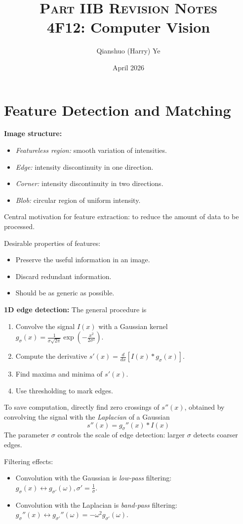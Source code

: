 \documentclass[12pt]{article}
\title{{\scshape  Part IIB Revision Notes} \\ 
    \vspace{0.5em}
    \textbf{4F12: Computer Vision}}
\author{Qianshuo (Harry) Ye}
\date{April 2026}
\begin{document}
\maketitle

\section{Feature Detection and Matching}
\textbf{Image structure:}
\begin{itemize}
    \item \textit{Featureless region:} smooth variation of intensities.
    \item \textit{Edge:} intensity discontinuity in one direction.
    \item \textit{Corner:} intensity discontinuity in two directions.
    \item \textit{Blob:} circular region of uniform intensity.
\end{itemize}

Central motivation for feature extraction: to reduce the amount of data to be processed.

Desirable properties of features:
\begin{itemize}
    \item Preserve the useful information in an image.
    \item Discard redundant information.
    \item Should be as generic as possible.
\end{itemize}

\textbf{1D edge detection:} The general procedure is
\begin{enumerate}
    \item Convolve the signal $I(x)$ with a Gaussian kernel $g_\sigma(x) = \frac{1}{\sigma\sqrt{2\pi}} \exp\left(-\frac{x^2}{2\sigma^2}\right)$.
    \item Compute the derivative $s'(x) = \frac{d}{dx} [I(x) * g_\sigma(x)]$.
    \item Find maxima and minima of $s'(x)$.
    \item Use thresholding to mark edges.
\end{enumerate}
To save computation, directly find zero crossings of $s''(x)$, obtained by convolving the signal with the \textit{Laplacian} of a Gaussian
$$
s''(x) = g_\sigma''(x) * I(x)
$$
The parameter $\sigma$ controls the scale of edge detection: larger $\sigma$ detects coarser edges.

Filtering effects:
\begin{itemize}
    \item Convolution with the Gaussian is \textit{low-pass} filtering: $g_\sigma(x) \leftrightarrow g_{\sigma'}(\omega), \sigma' = \frac{1}{\sigma}$.
    \item Convolution with the Laplacian is \textit{band-pass} filtering: $g_\sigma''(x) \leftrightarrow g_{\sigma'}''(\omega) = -\omega^2 g_{\sigma'}(\omega)$.
\end{itemize}
\end{document}

